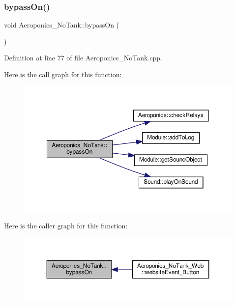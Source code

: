 \mbox{\label{class_aeroponics___no_tank_ab27144182f7b2a87da8e24b626bccf24}} 
\subsubsection{\texorpdfstring{bypass\+On()}{bypassOn()}\hspace{0.1cm}{\footnotesize\ttfamily [1/2]}}
{\footnotesize\ttfamily void Aeroponics\+\_\+\+No\+Tank\+::bypass\+On (\begin{DoxyParamCaption}{ }\end{DoxyParamCaption})\hspace{0.3cm}{\ttfamily [protected]}}



Definition at line 77 of file Aeroponics\+\_\+\+No\+Tank.\+cpp.

Here is the call graph for this function\+:
\nopagebreak
\begin{figure}[H]
\begin{center}
\leavevmode
\includegraphics[width=350pt]{class_aeroponics___no_tank_ab27144182f7b2a87da8e24b626bccf24_cgraph}
\end{center}
\end{figure}
Here is the caller graph for this function\+:
\nopagebreak
\begin{figure}[H]
\begin{center}
\leavevmode
\includegraphics[width=350pt]{class_aeroponics___no_tank_ab27144182f7b2a87da8e24b626bccf24_icgraph}
\end{center}
\end{figure}
\mbox{\label{class_aeroponics___no_tank_ab27144182f7b2a87da8e24b626bccf24}} 
